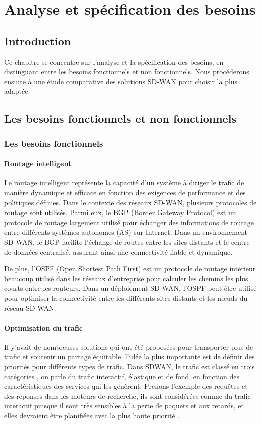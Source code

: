 
	\chapter{Analyse et spécification des besoins }
	\newpage
\section*{Introduction }

Ce chapitre se concentre sur l'analyse et la spécification des besoins, en distinguant entre les besoins fonctionnels et non fonctionnels. Nous procéderons ensuite à une étude comparative des solutions SD-WAN pour choisir la plus adaptée.

\section{Les besoins fonctionnels et non fonctionnels  }
\subsection{Les besoins fonctionnels }
\subsubsection{Routage intelligent  }

Le routage intelligent représente la capacité d'un système à diriger le trafic de manière dynamique et efficace en fonction des exigences de performance et des politiques définies. Dans le contexte des réseaux SD-WAN, plusieurs protocoles de routage sont utilisés. Parmi eux, le BGP (Border Gateway Protocol) est un protocole de routage largement utilisé pour échanger des informations de routage entre différents systèmes autonomes (AS) sur Internet. Dans un environnement SD-WAN, le BGP facilite l'échange de routes entre les sites distants et le centre de données centralisé, assurant ainsi une connectivité fiable et dynamique.

De plus, l'OSPF (Open Shortest Path First) est un protocole de routage intérieur beaucoup utilisé dans les réseaux d'entreprise pour calculer les chemins les plus courts entre les routeurs. Dans un déploiement SD-WAN, l'OSPF peut être utilisé pour optimiser la connectivité entre les différents sites distants et les nœuds du réseau SD-WAN.

\subsubsection{Optimisation du trafic  }
Il y’avait de nombreuses solutions qui  ont été proposées pour transporter plus de trafic et soutenir un partage équitable, l’idée la plus importante est de définir des priorités pour différents types de trafic.
Dans SDWAN, le trafic est classé en trois catégories , on parle du trafic interactif, élastique et de fond, en fonction des caractéristiques des services qui les génèrent.  Prenons l’exemple des requêtes et des réponses dans les moteurs de recherche, ils sont considérées comme du trafic interactif puisque il sont très sensibles à la perte de paquets et aux retards, et elles devraient être planifiées avec la plus haute priorité .

